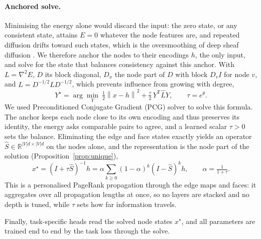 \documentclass{article}
\newcommand{\R}{\mathbb{R}}
\newcommand{\norm}[1]{\left\lVert #1\right\rVert}
\newcommand{\transpose}{\mathsf{T}}
\begin{document}
\paragraph{Anchored solve.} Minimising the energy alone would discard the input: the zero state, or any consistent state, attains $E=0$ whatever the node features are, and repeated diffusion drifts toward such states, which is the oversmoothing of deep sheaf diffusion \cite{bodnar2022neural}. We therefore anchor the nodes to their encodings $h$, the only input, and solve for the state that balances consistency against this anchor. With $L=\nabla^2E$, $D$ its block diagonal, $D_x$ the node part of $D$ with block $D_vI$ for node $v$, and $\hat L=D^{-1/2}LD^{-1/2}$, which prevents influence from growing with degree,
\begin{equation}
  Y^\star=\arg\min_Y\ \tfrac12\norm{x-h}^2+\tfrac{\tau}{2}\,Y^{\transpose}\hat LY,\qquad \tau=e^{\theta}.
  \label{eq:solve}
\end{equation}
We used Preconditioned Conjugate Gradient (PCG) solver to solve this formula. The anchor keeps each node close to its own encoding and thus preserves its identity, the energy asks comparable pairs to agree, and a learned scalar $\tau>0$ sets the balance. Eliminating the edge and face states exactly yields an operator $\hat S\in\R^{|V|d\times|V|d}$ on the nodes alone, and the representation is the node part of the solution (Proposition~\ref{prop:unique}),
\begin{equation}
  x^\star=(I+\tau\hat S)^{-1}h=\alpha\sum_{k\ge0}(1-\alpha)^k(I-\hat S)^kh,\qquad\alpha=\tfrac1{1+\tau}.
  \label{eq:xstar}
\end{equation}
This is a personalised PageRank propagation \cite{gasteiger2019appnp} through the edge maps and faces: it aggregates over all propagation lengths at once, so no layers are stacked and no depth is tuned, while $\tau$ sets how far information travels.

Finally, task-specific heads read the solved node states $x^\star$, and all parameters are trained end to end by the task loss through the solve.
\end{document}
